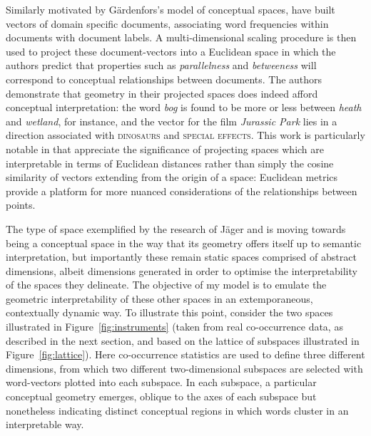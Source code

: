 {Similarly motivated by G\"{a}rdenfors's model of conceptual spaces, \cite{DerracEA2015} have built vectors of domain specific documents, associating word frequencies within documents with document labels.  A multi-dimensional scaling procedure is then used to project these document-vectors into a Euclidean space in which the authors predict that properties such as \emph{parallelness} and \emph{betweeness} will correspond to conceptual relationships between documents.  The authors demonstrate that geometry in their projected spaces does indeed afford conceptual interpretation: the word \emph{bog} is found to be more or less between \emph{heath} and \emph{wetland}, for instance, and the vector for the film \emph{Jurassic Park} lies in a direction associated with \textsc{dinosaurs} and \textsc{special effects}.  This work is particularly notable in that \citeauthor{DerracEA2015} appreciate the significance of projecting spaces which are interpretable in terms of Euclidean distances rather than simply the cosine similarity of vectors extending from the origin of a space: Euclidean metrics provide a platform for more nuanced considerations of the relationships between points.

The type of space exemplified by the research of J\"{a}ger and \citeauthor{Derrac} is moving towards being a conceptual space in the way that its geometry offers itself up to semantic interpretation, but importantly these remain static spaces comprised of abstract dimensions, albeit dimensions generated in order to optimise the interpretability of the spaces they delineate.  The objective of my model is to emulate the geometric interpretability of these other spaces in an extemporaneous, contextually dynamic way.  To illustrate this point, consider the two spaces illustrated in Figure~\ref{fig:instruments} (taken from real co-occurrence data, as described in the next section, and based on the lattice of subspaces illustrated in Figure~\ref{fig:lattice}).  Here co-occurrence statistics are used to define three different dimensions, from which two different two-dimensional subspaces are selected with word-vectors plotted into each subspace.  In each subspace, a particular conceptual geometry emerges, oblique to the axes of each subspace but nonetheless indicating distinct conceptual regions in which words cluster in an interpretable way.

}
